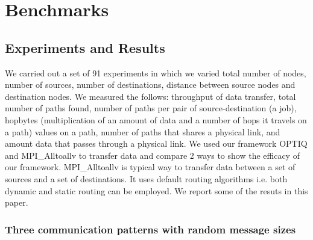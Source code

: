 \section{Benchmarks}
\label{sec:benchmark}





%



\subsection{Experiments and Results}

We carried out a set of 91 experiments in which we varied total number of nodes, number of sources, number of destinations, distance between source nodes and destination nodes. We measured the follows: throughput of data transfer, total number of paths found, number of paths per pair of source-destination (a job), hopbytes (multiplication of an amount of data and a number of hops it travels on a path) values on a path, number of paths that shares a physical link, and amount data that passes through a physical link. We used our framework OPTIQ and MPI\_Alltoallv to transfer data and compare 2 ways to show the efficacy of our framework. MPI\_Alltoallv is typical way to transfer data between a set of sources and a set of destinations. It uses default routing algorithms i.e. both dynamic and static routing can be employed. We report some of the resuts in this paper.



\subsubsection {Three communication patterns with random message sizes}


%
